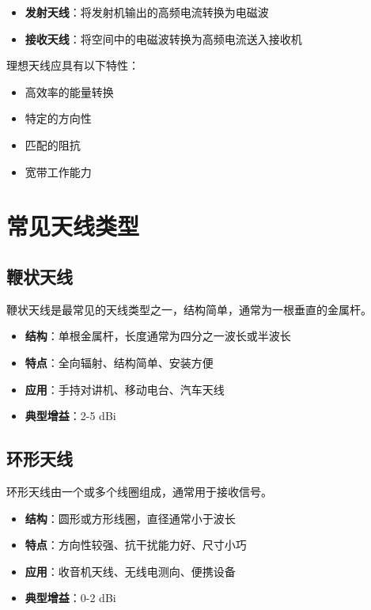 \begin{itemize}
    \item \textbf{发射天线}：将发射机输出的高频电流转换为电磁波
    \item \textbf{接收天线}：将空间中的电磁波转换为高频电流送入接收机
\end{itemize}

理想天线应具有以下特性：

\begin{itemize}
    \item 高效率的能量转换
    \item 特定的方向性
    \item 匹配的阻抗
    \item 宽带工作能力
\end{itemize}

\section{常见天线类型}
\label{sec:antenna_types}

\subsection{鞭状天线}
\label{sec:whip_antenna}

鞭状天线是最常见的天线类型之一，结构简单，通常为一根垂直的金属杆。

\begin{itemize}
    \item \textbf{结构}：单根金属杆，长度通常为四分之一波长或半波长
    \item \textbf{特点}：全向辐射、结构简单、安装方便
    \item \textbf{应用}：手持对讲机、移动电台、汽车天线
    \item \textbf{典型增益}：2-5 dBi
\end{itemize}

\subsection{环形天线}
\label{sec:loop_antenna}

环形天线由一个或多个线圈组成，通常用于接收信号。

\begin{itemize}
    \item \textbf{结构}：圆形或方形线圈，直径通常小于波长
    \item \textbf{特点}：方向性较强、抗干扰能力好、尺寸小巧
    \item \textbf{应用}：收音机天线、无线电测向、便携设备
    \item \textbf{典型增益}：0-2 dBi
\end{itemize}

